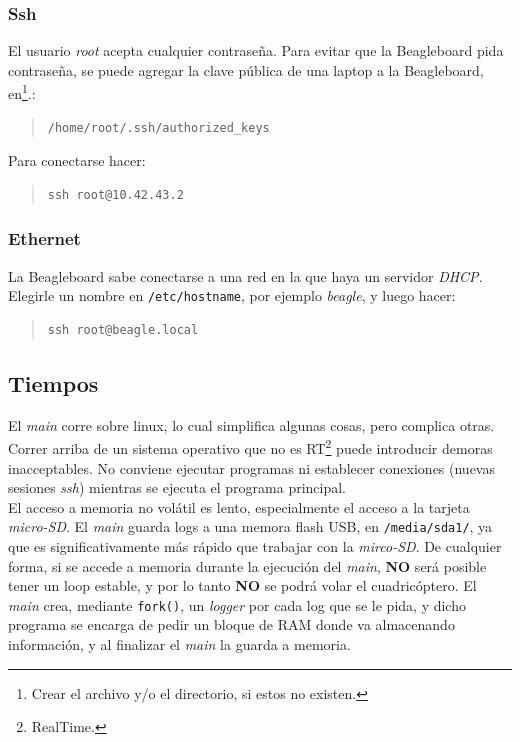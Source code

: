 \documentclass[main]{subfiles}
\begin{document}
\subsubsection{Ssh}
\label{sec:codigo:ssh}

El usuario \textit{root} acepta cualquier contraseña. Para evitar que la Beagleboard pida contraseña, se puede agregar la clave pública de una laptop a la Beagleboard, en\footnote{Crear el archivo y/o el directorio, si estos no existen.}.:
\begin{quote}
\begin{verbatim}
/home/root/.ssh/authorized_keys
\end{verbatim}
\end{quote}

Para conectarse hacer:
\begin{quote}
\begin{verbatim}
ssh root@10.42.43.2
\end{verbatim}
\end{quote}


\subsubsection{Ethernet}
\label{sec:codigo:ethernet}

La Beagleboard sabe conectarse a una red en la que haya un servidor \textit{DHCP}. Elegirle un nombre en \verb+/etc/hostname+, por ejemplo \textit{beagle}, y luego hacer:
\begin{quote}
\begin{verbatim}
ssh root@beagle.local
\end{verbatim}
\end{quote}

\subsection{Tiempos}
\label{sec:codigo:tiempos}

El \textit{main} corre sobre linux, lo cual simplifica algunas cosas, pero complica otras. Correr arriba de un sistema operativo que no es RT\footnote{RealTime.} puede introducir demoras inacceptables. No conviene ejecutar programas ni establecer conexiones (nuevas sesiones \textit{ssh}) mientras se ejecuta el programa principal.\\

El acceso a memoria no volátil es lento, especialmente el acceso a la tarjeta \textit{micro-SD}. El \textit{main} guarda logs a una memora flash USB, en \verb+/media/sda1/+, ya que es significativamente más rápido que trabajar con la \textit{mirco-SD}. De cualquier forma, si se accede a memoria durante la ejecución del \textit{main}, \textbf{NO} será posible tener un loop estable, y por lo tanto \textbf{NO} se podrá volar el cuadricóptero. El \textit{main} crea, mediante \verb+fork()+, un \textit{logger} por cada log que se le pida, y dicho programa se encarga de pedir un bloque de RAM donde va almacenando información, y al finalizar el \textit{main} la guarda a memoria.\\
\end{document}
